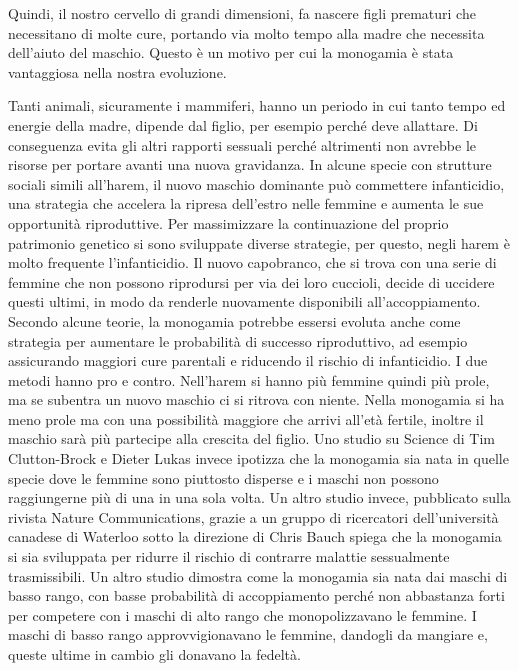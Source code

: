 \documentclass[12pt]{book} %
\begin{document}
Quindi, il nostro cervello di grandi dimensioni, fa nascere figli prematuri che necessitano di molte cure, portando via
molto tempo alla madre che necessita dell'aiuto del maschio. Questo è un motivo per cui la monogamia è stata vantaggiosa nella nostra evoluzione.

Tanti animali, sicuramente i mammiferi, hanno un periodo in cui tanto tempo ed energie della madre, dipende dal figlio, per esempio perché deve
allattare. Di conseguenza evita gli altri rapporti sessuali perché altrimenti non avrebbe le risorse per portare avanti una nuova gravidanza. In alcune specie con strutture sociali simili all’harem, il nuovo maschio dominante può commettere infanticidio, una strategia che accelera la ripresa dell’estro nelle femmine e aumenta le sue opportunità riproduttive. Per massimizzare
la continuazione del proprio patrimonio genetico si sono sviluppate diverse strategie, per questo, negli harem è molto
frequente l'infanticidio. Il nuovo capobranco, che si trova con una serie di femmine che non
possono riprodursi per via dei loro cuccioli, decide di uccidere questi ultimi, in modo da renderle nuovamente
disponibili all'accoppiamento. Secondo alcune teorie, la monogamia potrebbe essersi evoluta anche come strategia per aumentare le probabilità di successo riproduttivo, ad esempio assicurando maggiori cure parentali e riducendo il rischio di infanticidio. I due metodi
hanno pro e contro. Nell'harem si hanno più femmine quindi più prole, ma se subentra un nuovo
maschio ci si ritrova con niente. Nella monogamia si ha meno prole ma con una possibilità maggiore che arrivi
all'età fertile, inoltre il maschio sarà più partecipe alla crescita del figlio. Uno studio su
Science di Tim Clutton-Brock e Dieter Lukas invece ipotizza
che la monogamia sia nata in quelle specie dove le femmine sono piuttosto disperse e i maschi non possono raggiungerne
più di una in una sola volta. Un altro studio invece, pubblicato sulla rivista Nature Communications, grazie a un
gruppo di ricercatori dell'università canadese di Waterloo sotto la direzione di Chris Bauch
spiega che la monogamia si sia sviluppata per ridurre il rischio di contrarre malattie sessualmente
trasmissibili. Un altro studio dimostra come la monogamia sia
nata dai maschi di basso rango, con basse probabilità di accoppiamento perché non abbastanza forti per competere con i
maschi di alto rango che monopolizzavano le femmine. I maschi di basso rango approvvigionavano le femmine, dandogli da
mangiare e, queste ultime in cambio gli donavano la fedeltà.
\end{document}
